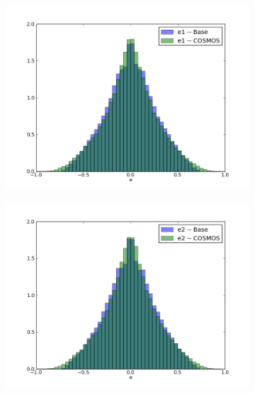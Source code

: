 \documentclass[]{article}
\begin{document}
{\begin{figure}[H]
\centering
\begin{subfigure}[b]{0.3\textwidth}
               \centering
              \includegraphics[width=\textwidth]{validation_figures/e1_hist.png}
               \label{fig:ellip1}
        \end{subfigure}
        \begin{subfigure}[b]{0.3\textwidth}
               \centering
               \includegraphics[width=\textwidth]{validation_figures/e2_hist.png}
               \label{fig:ellip2}
      \end{subfigure}


\end{figure}}
\end{document}
